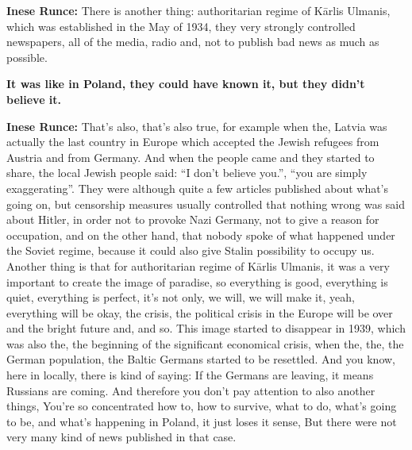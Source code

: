 \textbf{Inese Runce:} There is another thing: authoritarian regime of Kārlis Ulmanis, which was established in the May of 1934, they very strongly controlled newspapers, all of the media, radio and, not to publish bad news as much as possible.

\textbf{It was like in Poland, they could have known it, but they didn’t believe it.}

\textbf{Inese Runce:} That’s also, that’s also true, for example when the, Latvia was actually the last country in Europe which accepted the Jewish refugees from Austria and from Germany. And when the people came and they started to share, the local Jewish people said: ``I don’t believe you.'', ``you are simply exaggerating''.
They were although quite a few articles published about what’s going on, but censorship measures usually controlled that nothing wrong was said about Hitler, in order not to provoke Nazi Germany, not to give a reason for occupation, and on the other hand, that nobody spoke of what happened under the Soviet regime, because it could also give Stalin possibility to occupy us.\\
Another thing is that for authoritarian regime of Kārlis Ulmanis, it was a very important to create the image of paradise, so everything is good, everything is quiet, everything is perfect, it’s not only, we will, we will make it, yeah, everything will be okay, the crisis, the political crisis in the Europe will be over and the bright future and, and so. This image started to disappear in 1939, which was also the, the beginning of the significant economical crisis, when the, the, the German population, the Baltic Germans started to be resettled. And you know, here in locally, there is kind of saying: If the Germans are leaving, it means Russians are coming.
And therefore you don't pay attention to also another things, You're so concentrated how to, how to survive, what to do, what's going to be, and what's happening in Poland, it just loses it sense, But there were not very many kind of news published in that case.



